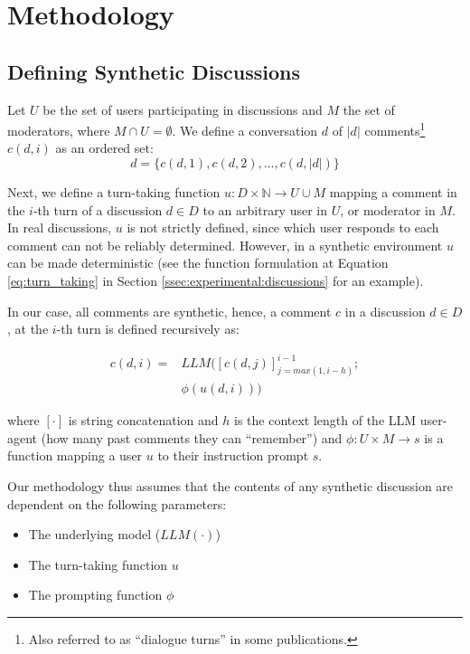 %

\section{Methodology}
\label{sec:methodology}

\subsection{Defining Synthetic Discussions}

Let $U$ be the set of users participating in discussions and $M$ the set of moderators, where $M \cap U = \emptyset$. We define a conversation $d$ of $\lvert d \rvert$ comments\footnote{Also referred to as “dialogue turns” in some publications.} $c(d, i)$ as an ordered set:
\begin{equation}
    d = \{c(d, 1), c(d, 2), \ldots, c(d, \lvert d \rvert)\}
\end{equation}


Next, we define a turn-taking function $u: D  \times \mathbb{N} \rightarrow U \cup M$ mapping a comment in the $i$-th turn of a discussion $d \in D$ to an arbitrary user in $U$, or moderator in $M$. In real discussions, $u$ is not strictly defined, since which user responds to each comment can not be reliably determined. However, in a synthetic environment $u$ can be made deterministic (see the function formulation at Equation \ref{eq:turn_taking} in Section \ref{ssec:experimental:discussions} for an example).

In our case, all comments are synthetic, hence, a comment $c$ in a discussion $d \in D$, at the $i$-th turn is defined recursively as:

\begin{equation}
\begin{split}
    c(d, i) = & LLM([c(d, j)]^{i-1}_{j=max(1, i-h)};\\
    &\phi(u(d, i)))
\end{split}
\end{equation}

\noindent where $[\cdot]$ is string concatenation and $h$ is the context length of the \ac{LLM} user-agent (how many past comments they can “remember”) and $\phi: U \times M \rightarrow s$ is a function mapping a user $u$ to their instruction prompt $s$.

Our methodology thus assumes that the contents of any synthetic discussion are dependent on the following parameters:
\begin{itemize}[noitemsep]
    \item The underlying model ($LLM(\cdot)$)
    \item The turn-taking function $u$
    \item The prompting function $\phi$
\end{itemize}


